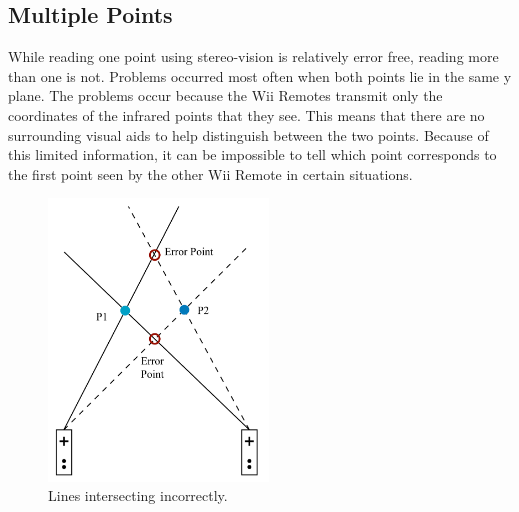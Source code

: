 \documentclass[a4paper,twoside]{article}
\begin{document}
\subsection{Multiple Points} 
While reading one point using stereo-vision is relatively error free, reading more than one is not. Problems occurred most often when both points lie in the same y plane. The problems occur because the Wii Remotes transmit only the coordinates of the infrared points that they see. This means that there are no surrounding visual aids to help distinguish between the two points. Because of this limited information, it can be impossible to tell which point corresponds to the first point seen by the other Wii Remote in certain situations.
\begin{figure}[ht]
    \begin{center}
        \includegraphics[height = 7.5cm]{Diagram5_IntersectingRays}
    \end{center}
    \caption{Lines intersecting incorrectly.}
    \label{intersection}
\end{figure}
\end{document}
